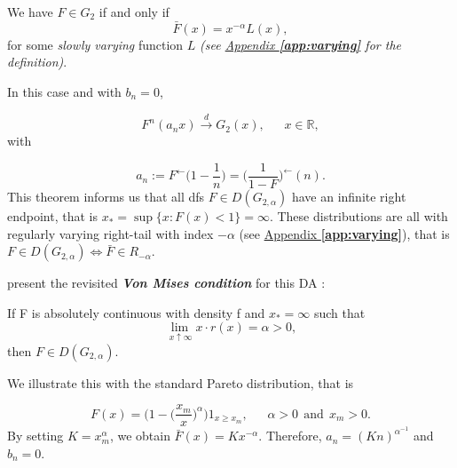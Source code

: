\begin{theorem}
We have $F \in G_{2}$ if and only if 
\begin{equation}
\bar{F}(x)=x^{-\alpha} L(x),
\end{equation}
for some \emph{slowly varying} function $L$ \emph{(see \hyperref[app:varying]{Appendix \textbf{\ref{app:varying}}} for the definition)}. 
\end{theorem}

In this case and with $b_n=0$,

\begin{equation*}
F^n(a_nx)\stackrel{d}{\to} G_2(x), \ \ \ \ \ \ \  x\in\mathbb{R},
\end{equation*}
with

\begin{equation*}
a_n:=F^{\leftarrow}\Big(1-\frac{1}{n}\Big)=\Big(\frac{1}{1-F}\Big)^{\leftarrow}(n).
\end{equation*}
This theorem informs us that all dfs $F\in D(G_{2,\alpha})$ have an infinite right endpoint, that is $x_*=\sup\{x:F(x)<1\}=\infty$. These distributions are all with regularly varying right-tail with index $-\alpha$ (see \hyperref[app:varying]{Appendix \textbf{\ref{app:varying}}}), that is $F\in D(G_{2,\alpha})\Longleftrightarrow \bar{F}\in R_{-\alpha}$.



\cite{falk_von_1993} present the revisited \emph{\textbf{Von Mises condition}} for this DA :

\begin{theorem}
If F is absolutely continuous with density f and $x_*=\infty$ such that 
\begin{equation*}
\displaystyle{\lim_{ \ x \uparrow \infty}} x \cdot r(x)=\alpha>0,
\end{equation*}
then $F\in D(G_{2,\alpha})$.
\end{theorem}
We illustrate this with the standard Pareto distribution, that is 

\begin{equation*}
F(x)=\bigg(1-\big(\frac{x_m}{x}\big)^{\alpha}\bigg)1_{x\geq x_m}, \ \ \ \ \ \ \ \alpha>0 \  \ \text{and} \ \ x_m>0.
\end{equation*}
By setting $K=x_m^{\alpha}$, we obtain $\bar{F}(x)=Kx^{-\alpha}$.
Therefore, $a_n=(Kn)^{\alpha^{-1}}$ and $b_n=0$.


